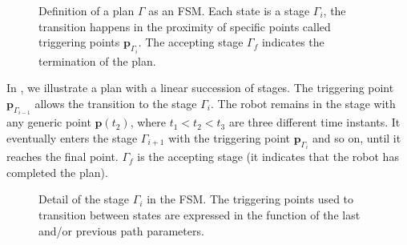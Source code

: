 \begin{figure}[h!]
  \center
  \caption[Definition of a plan]{Definition of a plan $\Gamma$ as an FSM. Each state is a stage $\Gamma_i$, the transition happens in the proximity of specific points called triggering points $\mathbf{p}_{\Gamma_i}$. The accepting stage $\Gamma_f$ indicates the termination of the plan.}
  \label{fig:state-machine}
\end{figure}
In , we illustrate a plan with a linear succession of stages. The triggering point $\mathbf{p}_{\Gamma_{i-1}}$ allows the transition to the stage $\Gamma_i$. The robot remains in the stage with any generic point $\mathbf{p}(t_2)$, where $t_1<t_2<t_3$ are three different time instants. It eventually enters the stage $\Gamma_{i+1}$ with the triggering point $\mathbf{p}_{\Gamma_i}$ and so on, until it reaches the final point. $\Gamma_f$ is the accepting stage (it indicates that the robot has completed the plan).
\begin{figure}[h!]
  \center
  \caption[Detail of a stage in the FSM]{Detail of the stage $\Gamma_i$ in the FSM. The triggering points used to transition between states are expressed in the function of the last and/or previous path parameters.}
  \label{fig:state-machine2}
\end{figure}
